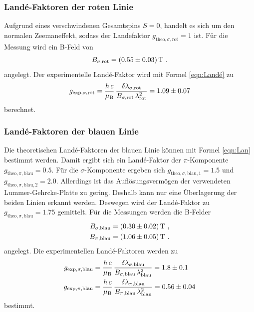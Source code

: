 \subsubsection{Landé-Faktoren der roten Linie}
Aufgrund eines verschwindenen Gesamtspins $S = 0$, handelt es sich um den normalen Zeemaneffekt, sodass der Landefaktor $g_{\text{theo},\sigma,\text{rot}} = 1$ ist. Für die Messung wird ein B-Feld von
\begin{align*}
  B_{\sigma,\text{rot}} = (\num{0.55 +- 0.03})\,\text{T} \ .
\end{align*}
angelegt. Der experimentelle Landé-Faktor wird mit Formel \eqref{eqn:Landé} zu
\begin{align*}
  g_{\text{exp},\sigma,\text{rot}} = \frac{h\,c}{\mu_\text{B}}\,\frac{\delta \lambda_{\sigma,\text{rot}}}{B_{\sigma,\text{rot}}\,\lambda_\text{rot}^2} = \num{1.09 +- 0.07}
\end{align*}
berechnet.



\subsubsection{Landé-Faktoren der blauen Linie}
Die theoretischen Landé-Faktoren der blauen Linie können mit Formel \eqref{eqn:Lan} bestimmt werden. Damit ergibt sich ein Landé-Faktor der $\pi$-Komponente $g_{\text{theo},\pi,\text{blau}} = 0.5$. Für die $\sigma$-Komponente ergeben sich $g_{\text{theo},\sigma,\text{blau},1} = 1.5$ und $g_{\text{theo},\sigma,\text{blau},2} = 2.0$. Allerdings ist das Auflösungsvermögen der verwendeten Lummer-Gehrcke-Platte zu gering. Deshalb kann nur eine Überlagerung der beiden Linien erkannt werden. Deswegen wird der Landé-Faktor zu $g_{\text{theo},\sigma,\text{blau}} = 1.75$ gemittelt.
Für die Messungen werden die B-Felder
\begin{align*}
  B_{\sigma,\text{blau}} = (\num{0.3 +- 0.02})\, \text{T}\ , \\
  B_{\pi,\text{blau}} = (\num{1.06 +- 0.05})\, \text{T}\ .
\end{align*}
angelegt. Die experimentellen Landé-Faktoren werden zu
\begin{align*}
  g_{\text{exp},\sigma,\text{blau}} &= \frac{h\,c}{\mu_\text{B}}\,\frac{\delta \lambda_{\sigma,\text{blau}}}{B_{\sigma,\text{blau}}\,\lambda_\text{blau}^2} = \num{1.8 +- 0.1} \\
  g_{\text{exp},\pi,\text{blau}} &= \frac{h\,c}{\mu_\text{B}}\,\frac{\delta \lambda_{\pi,\text{blau}}}{B_{\pi,\text{blau}}\,\lambda_\text{blau}^2} = \num{0.56 +- 0.04}
\end{align*}
bestimmt.
